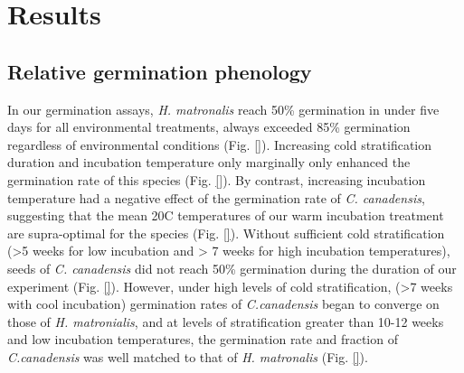 \documentclass{article}\usepackage[]{graphicx}\usepackage[]{color}
\begin{document}

\section*{Results}
\subsection*{Relative germination phenology}
In our germination assays, \textit{H. matronalis} reach 50\% germination in under five days for all environmental treatments, always exceeded 85\% germination regardless of environmental conditions (Fig. \ref{}). Increasing cold stratification duration and incubation temperature only marginally only enhanced the germination rate of this species (Fig. \ref{}). By contrast, increasing incubation temperature had a negative effect of the germination rate of \textit{C. canadensis}, suggesting that the mean 20\degree C temperatures of our warm incubation treatment are supra-optimal for the species (Fig. \ref{}). Without sufficient cold stratification (>5 weeks for low incubation and > 7 weeks for high incubation temperatures), seeds of  \textit{C. canadensis} did not reach 50\% germination during the duration of our experiment (Fig. \ref{}). However, under high levels of cold stratification, (>7 weeks with cool incubation) germination rates of \textit{C.canadensis} began to converge on those of \textit{H. matronialis}, and at levels of stratification greater than 10-12 weeks and low incubation temperatures, the germination rate and fraction of \textit{C.canadensis} was well matched to that of \textit{H. matronalis} (Fig. \ref{}).
\end{document}
